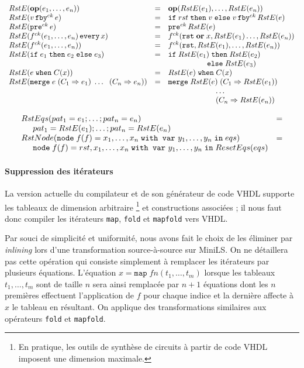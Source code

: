 \documentclass[a4paper]{article}
\newcommand{\mybox}[1]{\mbox{\tt{#1}}}
\newcommand{\ind}[0]{\hspace{0.5cm}}
\newcommand{\Node}[4]{\mybox{node} \; f(#1) = #2 \; \mybox{with var} \
  #3 \; \mybox{in} \; #4}
\newcommand{\Op}[2]{\mybox{\bf{op}}(#1,\dots,#2)}
\newcommand{\Fby}[2]{#1 \, \mybox{fby}^{ck} \, #2}
\newcommand{\Pre}[1]{\mybox{pre}^{ck} \, #1}
\newcommand{\Every}[4]{#1^{ck}(#2,\dots,#3) \, \mybox{every} \, #4}
\newcommand{\App}[2]{#1^{ck}(#2)}
\newcommand{\If}[3]{\mybox{if} \; #1 \; \mybox{then} \; #2 \; \mybox{else} \; #3}
\newcommand{\When}[3]{#1 \; \mybox{when} \; #2(#3)}
\newcommand{\Merge}[5]{\mybox{merge} \; #1 \; (#2 \Rightarrow #3) \; \dots \; \
  (#4 \Rightarrow #5)}
\newcommand{\Map}[3]{\mathtt{map} \; #1 n (#2,\dots,#3)}
\begin{document}
\[
\begin{array}{lcl}
  \re{\Op{e_1}{e_n}} & = & \Op{\re{e_1}}{\re{e_n}} \\
  \re{\Fby{v}{e}} & = & \If{rst}{v}{\Fby{v}{\re{e}}} \\
  \re{\Pre{e}} & = & \Pre{\re{e}} \\
  \re{\Every{f}{e_1}{e_n}{x}} & = & \App{f}{\mathtt{rst} \; \mathbf{or} \;
    x, \re{e_1} \dots, \re{e_n}} \\
  \re{\App{f}{e_1,\dots,e_n}} & = &
  \App{f}{\mathtt{rst},\re{e_1},\dots,\re{e_n}} \\
  \re{\If{e_1}{e_2}{e_3}} & = & \If{\re{e_1}}{\re{e_2}\\ & & \hspace{1.7cm}}
  {\re{e_3}} \\
  \re{\When{e}{C}{x}} & = & \When{\re{e}}{C}{x} \\
  \re{\Merge{e}{C_1}{e_1}{C_n}{e_n}} & = &
  \mybox{merge} \; \re{e} \; (C_1 \Rightarrow \re{e_1}) \\
  & & \hspace{2.2cm} \dots \\
  & & \hspace{2.2cm} (C_n \Rightarrow \re{e_n})
\end{array}
\]

\[
\begin{array}{ll}
  RstEqs(pat_1 = e_1;\dots;pat_n = e_n) & = \\
  \ind pat_1 = \re{e_1};\dots;pat_n = \re{e_n} \\
  \rstn{\Node{f}{x_1,\dots,x_n}{y_1,\dots,y_n}{eqs}} & = \\
  \ind \Node{f}{rst,x_1,\dots,x_n}{y_1,\dots,y_n}{ResetEqs(eqs)}
\end{array}
\]

\paragraph{Suppression des it\'erateurs}

La version actuelle du compilateur et de son g\'en\'erateur de code VHDL supporte
les tableaux de dimension arbitraire \footnote{En pratique, les outils de
  synth\`ese de circuits \`a partir de code VHDL imposent une dimension maximale.}
et constructions associ\'ees ; il nous faut donc compiler les it\'erateurs
\texttt{map}, \texttt{fold} et \texttt{mapfold} vers VHDL.

Par souci de simplicit\'e et uniformit\'e, nous avons fait le choix de les \'eliminer
par \textit{inlining} lors d'une transformation source-\`a-source sur MiniLS. On
ne d\'etaillera pas cette op\'eration qui consiste simplement \`a remplacer les
it\'erateurs par plusieurs \'equations. L'\'equation $x = \Map{f}{t_1}{t_m}$ lorsque
les tableaux $t_1, \dots, t_m$ sont de taille $n$ sera ainsi remplac\'ee par $n +
1$ \'equations dont les $n$ premi\`eres effectuent l'application de $f$ pour chaque
indice et la derni\`ere affecte \`a $x$ le tableau en r\'esultant. On applique des
transformations similaires aux op\'erateurs \texttt{fold} et \texttt{mapfold}.
\end{document}
